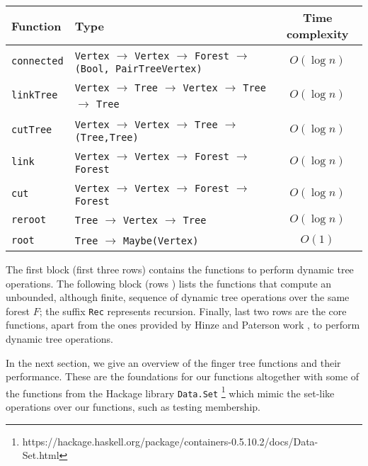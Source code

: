 \begin{center}
\small
 \begin{tabular}{||l | l | c||} 
 \hline
 Function & Type & Time complexity \\ %
 \hline\hline
 \texttt{connected} & \texttt{Vertex} $\to$ \texttt{Vertex} $\to$ \texttt{Forest} $\to$ \texttt{(Bool, PairTreeVertex)} & $O(\log n)$ \\ 
 \texttt{linkTree} & \texttt{Vertex} $\to$ \texttt{Tree} $\to$ \texttt{Vertex} $\to$ \texttt{Tree} $\to$ \texttt{Tree} & $O(\log n)$ \\
 \texttt{cutTree} & \texttt{Vertex} $\to$ \texttt{Vertex} $\to$ \texttt{Tree} $\to$ \texttt{(Tree,Tree)} & $O(\log n)$ \\
 \hline
 \texttt{link} & \texttt{Vertex} $\to$ \texttt{Vertex} $\to$ \texttt{Forest} $\to$ \texttt{Forest} & $O(\log n)$ \\
 \texttt{cut} & \texttt{Vertex} $\to$ \texttt{Vertex} $\to$ \texttt{Forest} $\to$ \texttt{Forest} & $O(\log n)$ \\
 \hline
 \texttt{reroot} & \texttt{Tree} $\to$ \texttt{Vertex} $\to$ \texttt{Tree} & $O(\log n)$ \\
 \texttt{root} & \texttt{Tree} $\to$ \texttt{Maybe(Vertex)} & $O(1)$ \\
 \hline   
\end{tabular}
\end{center}
\normalsize 

The first block (first three rows) contains the functions to perform dynamic tree operations. The following block (rows  ) lists the functions that compute an unbounded, although finite, sequence of dynamic tree operations over the same forest $F$; the suffix \texttt{Rec} represents recursion. Finally, last two rows are the core functions, apart from the ones provided by Hinze and Paterson work \cite{FTs}, to perform dynamic tree operations. 

In the next section, we give an overview of the finger tree functions and their performance. These are the foundations for our functions altogether with some of the functions from the Hackage library \texttt{Data.Set} \footnote{https://hackage.haskell.org/package/containers-0.5.10.2/docs/Data-Set.html} which mimic the set-like operations over our functions, such as testing membership. 

